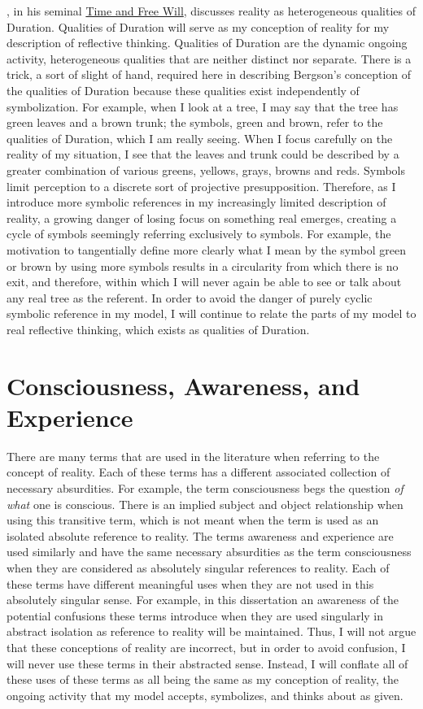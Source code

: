 \cite{bergson:1910}, in his seminal \underline{Time and Free Will},
discusses reality as heterogeneous qualities of Duration.  Qualities
of Duration will serve as my conception of reality for my description
of reflective thinking.  Qualities of Duration are the dynamic ongoing
activity, heterogeneous qualities that are neither distinct nor
separate.  There is a trick, a sort of slight of hand, required here
in describing Bergson's conception of the qualities of Duration
because these qualities exist independently of symbolization.  For
example, when I look at a tree, I may say that the tree has green
leaves and a brown trunk; the symbols, green and brown, refer to the
qualities of Duration, which I am really seeing.  When I focus
carefully on the reality of my situation, I see that the leaves and
trunk could be described by a greater combination of various greens,
yellows, grays, browns and reds.  Symbols limit perception to a
discrete sort of projective presupposition.  Therefore, as I introduce
more symbolic references in my increasingly limited description of
reality, a growing danger of losing focus on something real emerges,
creating a cycle of symbols seemingly referring exclusively to
symbols.  For example, the motivation to tangentially define more
clearly what I mean by the symbol green or brown by using more symbols
results in a circularity from which there is no exit, and therefore,
within which I will never again be able to see or talk about any real
tree as the referent.  In order to avoid the danger of purely cyclic
symbolic reference in my model, I will continue to relate the parts of
my model to real reflective thinking, which exists as qualities of
Duration.

\section{Consciousness, Awareness, and Experience}

There are many terms that are used in the literature when referring to
the concept of reality.  Each of these terms has a different
associated collection of necessary absurdities.  For example, the term
consciousness begs the question \emph{of what} one is conscious.
There is an implied subject and object relationship when using this
transitive term, which is not meant when the term is used as an
isolated absolute reference to reality.  The terms awareness and
experience are used similarly and have the same necessary absurdities
as the term consciousness when they are considered as absolutely
singular references to reality.  Each of these terms have different
meaningful uses when they are not used in this absolutely singular
sense.  For example, in this dissertation an awareness of the
potential confusions these terms introduce when they are used
singularly in abstract isolation as reference to reality will be
maintained.  Thus, I will not argue that these conceptions of reality
are incorrect, but in order to avoid confusion, I will never use these
terms in their abstracted sense.  Instead, I will conflate all of
these uses of these terms as all being the same as my conception of
reality, the ongoing activity that my model accepts, symbolizes, and
thinks about as given.

